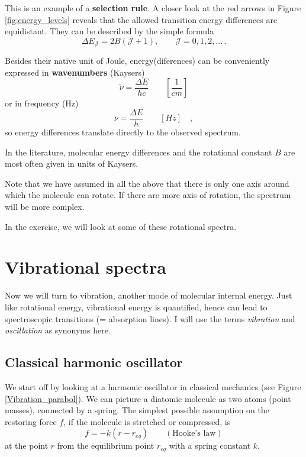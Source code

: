 This is an example of a \textbf{selection rule}. A closer look at the
red arrows in Figure \ref{fig:energy_levels} reveals that the allowed
transition energy differences are equidistant. They can be described
by the simple formula
\begin{equation}
\Delta E_\mathcal{J} = 2B(\mathcal{J}+1), \qquad \mathcal{J} = 0, 1, 2, ...\,.
\end{equation}

Besides their native unit of Joule,
energy(diferences) can be conveniently expressed in
\textbf{wavenumbers} (Kaysers)
\begin{equation}
\tilde{\nu} = \frac{\Delta E}{hc} \qquad \left[\frac{1}{cm}\right]
\end{equation}
or in frequency (Hz)
\begin{equation}
\nu = \frac{\Delta E}{h} \qquad \left[Hz\right] \quad ,
\end{equation}
so energy differences translate directly to the observed spectrum.

In the literature, molecular energy differences and the rotational
constant $B$ are most often given in
units of Kaysers.

Note that we have assumed in all the above that there is only one
axis around which the molecule can rotate. If there are more axis of
rotation, the spectrum will be more complex.

In the exercise, we will look at some of these rotational spectra.


\clearpage
\section{Vibrational spectra}
Now we will turn to vibration, another mode of molecular internal
energy. Just like rotational energy, vibrational energy is quantified,
hence can lead to spectroscopic transitions (= absorption lines). I
will use the terms \emph{vibration} and \emph{oscillation} as synonyms here.

\subsection{Classical harmonic oscillator}
We start off by looking at a harmonic oscillator in classical
mechanics (see Figure \ref{Vibration_parabol}). We can picture a
diatomic molecule as two atoms (point masses), connected by a
spring. The simplest possible assumption on the restoring force $f$, if
the molecule is stretched or compressed, is 
\begin{equation}
\label{eq:hooke}
f = -k (r-r_{eq}) \qquad (\text{Hooke's law})
\end{equation}
at the point $r$ from the equilibrium point $r_{eq}$ with a spring
constant $k$. 

